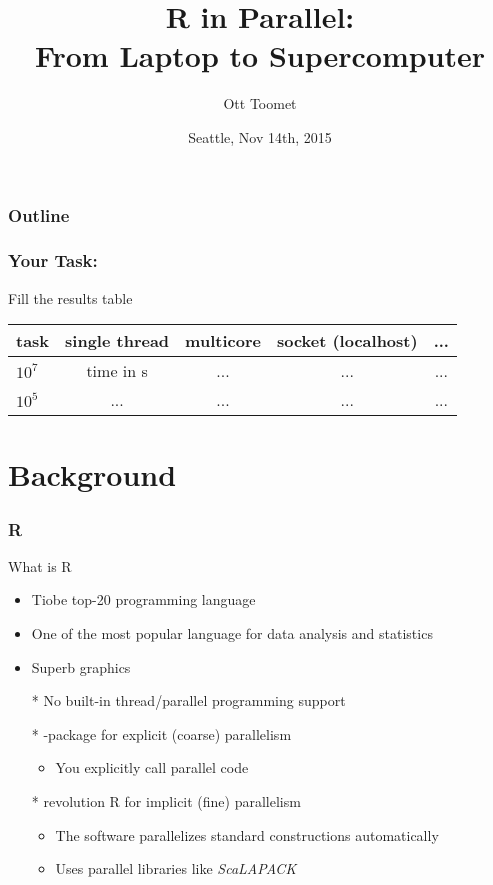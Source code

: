 \documentclass[pdftex]{beamer}
\title[parallel R]{R in Parallel:\\
  From Laptop to Supercomputer}
\author{Ott Toomet}
\date{Seattle, Nov 14th, 2015}
\newcommand{\R}{\textsf{R}\xspace}
\begin{document}
\begin{frame}
  \titlepage
\end{frame}

\begin{frame}
  \frametitle{Outline}
  \tableofcontents
\end{frame}

\begin{frame}
  \frametitle{Your Task:}
  Fill the results table
  \begin{tabular}{l cccc}
    \toprule
    task      & single thread & multicore & socket (localhost) & ... \\
    \midrule
    $10^{7}$  & time in s     & ...       & ...                & ...\\
    $10^{5}$  & ...           & ...       & ...                & ...\\
    \bottomrule
  \end{tabular}
  
\end{frame}

\section{Background}

\begin{frame}
  \frametitle{\R}
  What is \R
  \begin{itemize}
  \item Tiobe top-20 programming language
  \item One of the most popular language for data analysis and statistics
  \item Superb graphics
    \pause
  \item[*] No built-in thread/parallel programming support
  \item[*] -package for explicit (coarse) parallelism
    \begin{itemize}
    \item You explicitly call parallel code
    \end{itemize}
  \item[*] revolution R for implicit (fine) parallelism
    \begin{itemize}
    \item The software parallelizes standard constructions
      automatically
    \item Uses parallel libraries like \emph{ScaLAPACK}
    \end{itemize}
  \end{itemize}
\end{frame}
\end{document}

